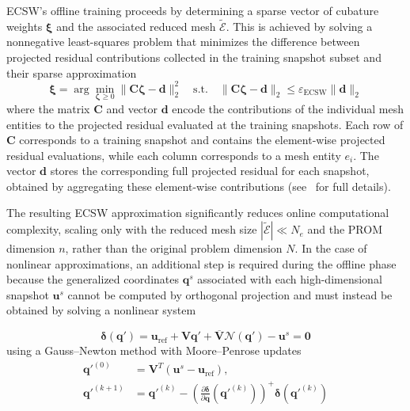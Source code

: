 \documentclass[preprint,10pt]{elsarticle}
\begin{document}
ECSW's offline training proceeds by determining a sparse vector of cubature weights $\boldsymbol{\xi}$ and the associated reduced mesh $\widetilde{\mathcal{E}}$. This is achieved by solving a nonnegative least-squares problem that minimizes the difference between projected residual contributions collected in the training snapshot subset and their sparse approximation
\begin{equation}
\boldsymbol{\xi} = \arg\min_{\boldsymbol{\zeta}\geq 0}\|\mathbf{C}\boldsymbol{\zeta}-\mathbf{d}\|_2^2 
\quad \text{s.t.}\quad 
\|\mathbf{C}\boldsymbol{\zeta}-\mathbf{d}\|_2 \leq \varepsilon_{\mathrm{ECSW}}\|\mathbf{d}\|_2
\end{equation}
where the matrix $\mathbf{C}$ and vector $\mathbf{d}$ encode the contributions of the individual mesh entities to the projected residual evaluated at the training snapshots. Each row of $\mathbf{C}$ corresponds to a training snapshot and contains the element-wise projected residual evaluations, while each column corresponds to a mesh entity $e_i$. The vector $\mathbf{d}$ stores the corresponding full projected residual for each snapshot, obtained by aggregating these element-wise contributions (see~\cite{farhat2015structure,barnett2023neural} for full details).

The resulting ECSW approximation significantly reduces online computational complexity, 
scaling only with the reduced mesh size $|\widetilde{\mathcal{E}}|\ll N_e$ and the PROM 
dimension $n$, rather than the original problem dimension $N$. In the case of nonlinear 
approximations, an additional step is required during the offline phase because the 
generalized coordinates $\mathbf{q}^s$ associated with each high-dimensional snapshot 
$\mathbf{u}^s$ cannot be computed by orthogonal projection and must instead be obtained 
by solving a nonlinear system

\begin{equation}
\boldsymbol{\delta}(\mathbf{q}') =
\mathbf{u}_{\mathrm{ref}} + \mathbf{V} \mathbf{q}' + \overline{\mathbf{V}} \mathcal{N}(\mathbf{q}') - \mathbf{u}^s = \mathbf{0}
\end{equation}
using a Gauss--Newton method with Moore--Penrose updates
\begin{align}
\mathbf{q}'^{(0)} &= \mathbf{V}^T (\mathbf{u}^s - \mathbf{u}_{\mathrm{ref}}), \\
\mathbf{q}'^{(k+1)} &= \mathbf{q}'^{(k)} -
\left( \frac{\partial \boldsymbol{\delta}}{\partial \mathbf{q}}(\mathbf{q}'^{(k)}) \right)^{\!\!+}
\boldsymbol{\delta}(\mathbf{q}'^{(k)})
\end{align}
\end{document}
